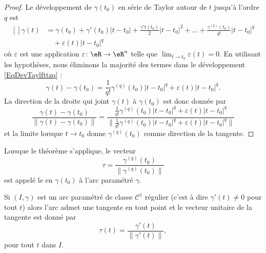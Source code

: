 \begin{proof}

Le développement de $\gamma(t_0)$ en série de Taylor autour de $t$ jusqu'à l'ordre $q$ est
\begin{equation}        \label{EqDevTaylfttzq}
    \begin{aligned}[]
        \gamma(t)&=\gamma(t_0)+\gamma'(t_0)| t-t_0 |+\frac{ \gamma't(t_0) }{2}| t-t_0 |^2+\ldots +\frac{ \gamma^{(q)}(t_0) }{ q! }| t-t_0 |^q\\
            &\quad+\varepsilon(t)| t-t_0 |^q
    \end{aligned}
\end{equation}
où $\varepsilon$ est une application $\varepsilon\colon \eR\to \eR^n$ telle que $\lim_{t\to t_0} \varepsilon(t)=0$. En utilisant les hypothèses, nous éliminons la majorité des termes dans le développement \eqref{EqDevTaylfttzq} :
\begin{equation}
    \gamma(t)-\gamma(t_0)=\frac{1}{ q! }\gamma^{(q)}(t_0)| t-t_0 |^q+\varepsilon(t)| t-t_0 |^q.
\end{equation}
La direction de la droite qui joint $\gamma(t)$ à $\gamma(t_0)$ est donc donnée par
\begin{equation}
    \frac{ \gamma(t)-\gamma(t_0) }{ \| \gamma(t)-\gamma(t_0) \| }=\frac{ \frac{1}{ q! }\gamma^{(q)}(t_0)| t-t_0 |^q+\varepsilon(t)| t-t_0 |^q }{ \| \frac{1}{ q! }\gamma^{(q)}(t_0)| t-t_0 |^q+\varepsilon(t)| t-t_0 |^q\|  }
\end{equation}
et la limite lorsque $t\to t_0$ donne $\gamma^{(q)}(t_0)$ comme direction de la tangente.

\end{proof}

Lorsque le théorème s'applique, le vecteur
\begin{equation}
\tau=\frac{ \gamma^{(q)}(t_0) }{ \| \gamma^{(q)}(t_0) \| }
\end{equation}
est appelé le  en $\gamma(t_0)$ à l'arc paramétré $\gamma$.


\begin{corollary}       \label{CorTgSoCun}
Si $(I,\gamma)$ est un arc paramétré de classe $\mathcal{C}^1$ régulier (c'est à dire $\gamma'(t)\neq 0$ pour tout $t$) alors l'arc admet une tangente en tout point et le vecteur unitaire de la tangente est donné par
\begin{equation}
    \tau(t)=\frac{ \gamma'(t) }{ \| \gamma'(t) \| },
\end{equation}
pour tout $t$ dans $I$.
\end{corollary}

